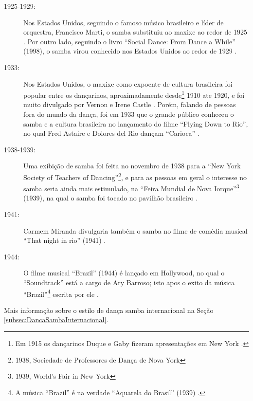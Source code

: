 \begin{description}
\item[1925-1929:] Nos Estados Unidos, seguindo o famoso músico brasileiro e líder de orquestra, 
Francisco Marti,
o samba substituiu ao maxixe ao redor de 1925 \cite[pp. 238]{hostetler1942walk}.
Por outro lado, seguindo o livro ``Social Dance: From Dance a While'' (1998),
o samba virou conhecido nos Estados Unidos ao redor de 1929
\cite[pp. 125]{harris1998social}.

\item[1933:] Nos Estados Unidos, o maxixe como expoente de cultura brasileira foi popular 
entre os dançarinos, aproximadamente desde\footnote{Em 
1915 os dançarinos Duque e Gaby fizeram apresentações em New York \cite[pp. 45]{maxixe1915duqueEEUU:1}.} 1910
ate 1920, e foi muito divulgado por Vernon e Irene Castle \cite[pp. 44]{stephenson1992complete}.
Porém, falando de pessoas fora do mundo da dança, 
foi em 1933 que o grande público conheceu o samba e a cultura brasileira no lançamento do filme
``Flying Down to Rio'',
no qual Fred Astaire e Dolores del Rio dançam ``Carioca'' \cite[pp. 45]{maxixe1915duqueEEUU:1}.

\item[1938-1939:] Uma exibição de samba foi feita no novembro de 1938
para a ``New York Society of Teachers of Dancing''\footnote{1938, Sociedade de Professores de Dança de Nova York},
e para as pessoas em geral o interesse no samba seria ainda mais estimulado,
na ``Feira Mundial de Nova Iorque''\footnote{1939, World’s Fair in New York} (1939), 
na qual o samba foi tocado no pavilhão brasileiro  \cite[pp. 45]{maxixe1915duqueEEUU:1}.

\item[1941:] Carmem Miranda divulgaria também o samba no
 filme de comédia musical ``That night in rio'' (1941) \cite[pp. 45]{maxixe1915duqueEEUU:1}.

\item[1944:] O filme musical ``Brazil'' (1944) é lançado em Hollywood,
no qual o ``Soundtrack'' está a cargo de Ary Barroso;
isto apos o exito da música ``Brazil''\footnote{A 
música ``Brazil'' é na verdade ``Aquarela do Brasil'' (1939) 
\cite[pp. 73]{diniz2006almanaque} \cite[pp. 128]{perna2002samba} \cite[pp. 77]{fenerick2005nem}.} 
escrita por ele \cite[pp. 45]{maxixe1915duqueEEUU:1}.

\end{description}

Mais informação sobre o estilo de dança samba internacional na Seção \ref{subsec:DancaSambaInternacional}.

